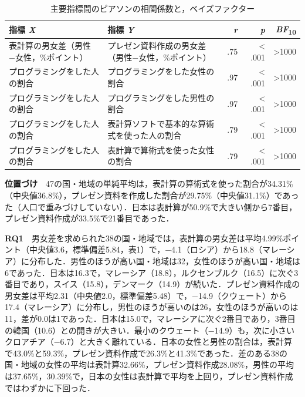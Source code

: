 \documentclass[a4paper,10pt,twocolumn]{ltjsarticle}
\makeatletter
\renewcommand{\section}{\@startsection{section}{1}{\z@}{1.1\Cvs \@plus.4\Cdp \@minus.2\Cdp}{.5\Cvs \@plus.2\Cdp}{\normalfont\gtfamily\bfseries\large}}
\makeatother
\begin{document}
\begin{table}[!t]
\caption{主要指標間のピアソンの相関係数と，ベイズファクター}
\centering\small
\begin{tabular}{>{\raggedright\arraybackslash}p{6.4cm}>{\raggedright\arraybackslash}p{6.4cm}rrr}
\toprule
指標 \textit{X} & 指標 \textit{Y} & \textit{r} & \textit{p} & \textit{BF}\textsubscript{10} \\
\midrule
表計算の男女差（男性−女性，\%ポイント） & プレゼン資料作成の男女差（男性−女性，\%ポイント） & .75 & < .001 & >1000 \\
プログラミングをした人の割合 & プログラミングをした女性の割合 & .97 & < .001 & >1000 \\
プログラミングをした人の割合 & プログラミングをした男性の割合 & .97 & < .001 & >1000 \\
プログラミングをした人の割合 & 表計算ソフトで基本的な算術式を使った人の割合 & .79 & < .001 & >1000 \\
プログラミングをした人の割合 & 表計算で算術式を使った女性の割合 & .79 & < .001 & >1000 \\
\bottomrule
\end{tabular}
\par{}
\end{table}
\section{結果}
\textbf{位置づけ}　47の国・地域の単純平均は，表計算の算術式を使った割合が34.31\%（中央値36.8\%），プレゼン資料を作成した割合が29.75\%（中央値31.1\%）であった（人口で重みづけしていない）．日本は表計算が50.9\%で大きい側から7番目，プレゼン資料作成が33.5\%で21番目であった．

\textbf{RQ1}　男女差を求められた38の国・地域では，表計算の男女差は平均4.99\%ポイント（中央値3.6，標準偏差5.84，表1）で，−4.1（ロシア）から18.8（マレーシア）に分布した．男性のほうが高い国・地域は32，女性のほうが高い国・地域は6であった．日本は16.3で，マレーシア（18.8），ルクセンブルク（16.5）に次ぐ3番目であり，スイス（15.8），デンマーク（14.9）が続いた．プレゼン資料作成の男女差は平均2.31（中央値2.0，標準偏差5.48）で，−14.9（クウェート）から17.4（マレーシア）に分布し，男性のほうが高いのは26，女性のほうが高いのは11，差が0.0は1であった．日本は15.0で，マレーシアに次ぐ2番目であり，3番目の韓国（10.6）との開きが大きい．最小のクウェート（−14.9）も，次に小さいクロアチア（−6.7）と大きく離れている．日本の女性と男性の割合は，表計算で43.0\%と59.3\%，プレゼン資料作成で26.3\%と41.3\%であった．差のある38の国・地域の女性の平均は表計算32.66\%，プレゼン資料作成28.08\%，男性の平均は37.65\%，30.39\%で，日本の女性は表計算で平均を上回り，プレゼン資料作成ではわずかに下回った．
\end{document}
